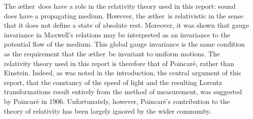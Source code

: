 \documentclass[10pt, fleqn,final,showtrims,oldfontcommands, article,a4paper,oneside]{memoir} %
\newcommand{\aether}{\ae ther}
\newcommand{\Poincare}{Poincar{\'e}\xspace}
\begin{document}











The \aether\ does have a role in the relativity theory used in this report:
sound does have a propagating medium.
However, the \aether\ is relativistic in the sense that it does not define a state of absolute rest. 
%
Moreover, it was shown that gauge invariance in Maxwell's relations may be interpreted as an invariance to the  potential flow of the medium.
This global gauge invariance is the same condition as the requirement that the \aether\ be invariant to uniform motions.
The relativity theory used in this report is therefore that of \Poincare, rather than Einstein.
Indeed, as was noted in the introduction,
the central argument of this report,
that the constancy of the speed of light and the resulting Lorentz transformations
result entirely from the method of measurement, 
was suggested by \Poincare in 1906\cite{Poincare1906}.
Unfortunately, however, \Poincare's contribution to the theory of relativity has been largely ignored by the wider community.
\end{document}
